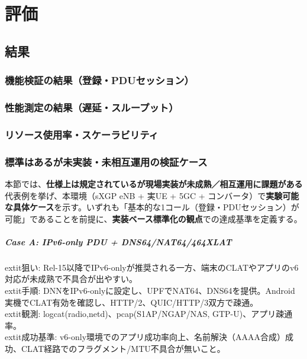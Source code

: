 \chapter{評価}
\label{chap:evaluation}

\section{結果}
\subsection{機能検証の結果（登録・PDUセッション）}
\subsection{性能測定の結果（遅延・スループット）}
\subsection{リソース使用率・スケーラビリティ}

\subsection{標準はあるが未実装・未相互運用の検証ケース}
本節では、\textbf{仕様上は規定されているが現場実装が未成熟／相互運用に課題がある}代表例を挙げ、本環境（sXGP eNB + 実UE + 5GC + コンバータ）で\textbf{実験可能な具体ケース}を示す。いずれも「基本的な1コール（登録・PDUセッション）が可能」であることを前提に、\textbf{実装ベース標準化の観点}での達成基準を定義する。

\paragraph{Case A: IPv6-only PDU + DNS64/NAT64/464XLAT}
	extit{狙い}: Rel-15以降でIPv6-onlyが推奨される一方、端末のCLATやアプリのv6対応が未成熟で不具合が出やすい。\\
	extit{手順}: DNNをIPv6-onlyに設定し、UPFでNAT64、DNS64を提供。Android実機でCLAT有効を確認し、HTTP/2、QUIC/HTTP/3双方で疎通。\\
	extit{観測}: logcat(radio,netd)、pcap(S1AP/NGAP/NAS, GTP-U)、アプリ疎通率。\\
	extit{成功基準}: v6-only環境でのアプリ成功率向上、名前解決（AAAA合成）成功、CLAT経路でのフラグメント/MTU不具合が無いこと。

